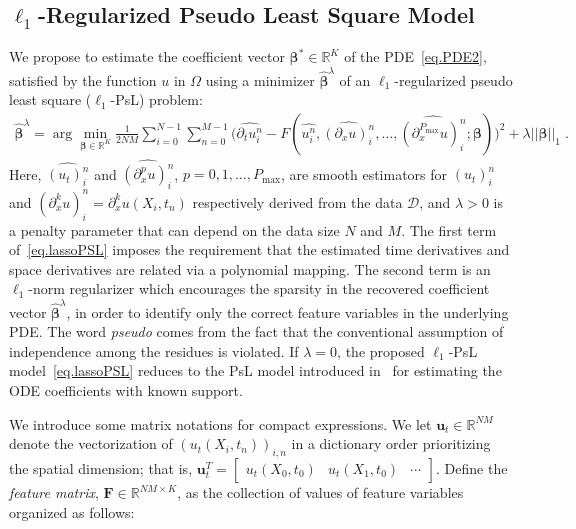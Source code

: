 \documentclass[a4paper,11pt]{article}
\newcommand{\bbeta}{\bm{\beta}}
\begin{document}
 \subsection{$\ell_1$-Regularized Pseudo Least Square Model}
We propose to estimate the coefficient vector $\bbeta^*\in\mathbb{R}^K$ of the PDE~\eqref{eq.PDE2}, satisfied by the function $u$ in $\Omega$ using a minimizer $\widehat{\bbeta}^\lambda$ of an $\ell_1$-regularized pseudo least square ($\ell_1$-PsL) problem:
\begin{align}
	\widehat{\bbeta}^\lambda = \arg\min_{\bbeta\in\mathbb{R}^K} \frac{1}{2NM}\sum_{i=0}^{N-1}\sum_{n=0}^{M-1} \big(\widehat{\partial_tu_i^n}-F(\widehat{u_i^n},\widehat{(\partial_xu)_i^n},\dots,\widehat{(\partial_x^{P_{\max}}u)_i^n};\bbeta)\big)^2+\lambda||\bbeta||_1\;.\label{eq.lassoPSL}
\end{align}
Here, $\widehat{(u_t)_i^n}$ and $\widehat{(\partial_x^pu)_i^n}$, $p=0,1,\dots,P_{\max}$, are smooth estimators for $(u_t)_i^n$ and $(\partial_x^ku)_i^n=\partial_x^ku(X_i,t_n)$ respectively derived from the data $\mathcal{D}$, and $\lambda>0$ is a penalty parameter that can depend on the data size $N$ and $M$. The first term of~\eqref{eq.lassoPSL} imposes the requirement that the estimated time derivatives and space derivatives are related via a polynomial mapping. The second term is an $\ell_1$-norm regularizer which encourages the sparsity in the recovered coefficient vector $\widehat{\bbeta}^\lambda$, in order to identify only the correct feature variables in the underlying PDE. The word \textit{pseudo} comes from the fact that the conventional assumption of independence among the residues is violated. If $\lambda=0$, the proposed $\ell_1$-PsL model~\eqref{eq.lassoPSL} reduces to the PsL model introduced in~\cite{liang2008parameter} for estimating the ODE coefficients with known support.

We introduce some matrix notations for compact expressions. We let $\mathbf{u}_t\in\mathbb{R}^{NM}$ denote the vectorization of $(u_t(X_i,t_n))_{i,n}$ in a dictionary order prioritizing the spatial dimension; that is, $\mathbf{u}_t^T=\begin{bmatrix}
u_t(X_0,t_0)&u_t(X_1,t_0)&\cdots	
\end{bmatrix}
$. Define the \textit{feature matrix}, $\mathbf{F}\in\mathbb{R}^{NM\times K}$, as the collection of values of feature variables organized as follows:
\end{document}
